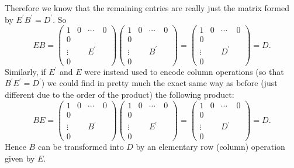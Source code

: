 \documentclass[11pt]{article}
\begin{document}
Therefore we know that the remaining entries are really just the matrix formed by $E^{\prime}B^{\prime} = D^{\prime}$. So $$EB = \begin{pmatrix}
    1 & 0 & \cdots & 0 \\
    0 \\
    \vdots & & E^{\prime}\\
    0
\end{pmatrix}\begin{pmatrix}
    1 & 0 & \cdots & 0 \\
    0 \\
    \vdots & & B^{\prime}\\
    0
\end{pmatrix} = \begin{pmatrix}
    1 & 0 & \cdots & 0 \\
    0 \\
    \vdots & & D^{\prime}\\
    0
\end{pmatrix} = D.$$ Similarly, if $E^{\prime}$ and $E$ were instead used to encode column operations (so that $B^{\prime}E^{\prime} = D^{\prime}$) we could find in pretty much the exact same way as before (just different due to the order of the product) the following product: $$BE = \begin{pmatrix}
    1 & 0 & \cdots & 0 \\
    0 \\
    \vdots & & B^{\prime}\\
    0
\end{pmatrix}\begin{pmatrix}
    1 & 0 & \cdots & 0 \\
    0 \\
    \vdots & & E^{\prime}\\
    0
\end{pmatrix} = \begin{pmatrix}
    1 & 0 & \cdots & 0 \\
    0 \\
    \vdots & & D^{\prime}\\
    0
\end{pmatrix} = D.$$ Hence $B$ can be transformed into $D$ by an elementary row (column) operation given by $E$.
\end{document}
